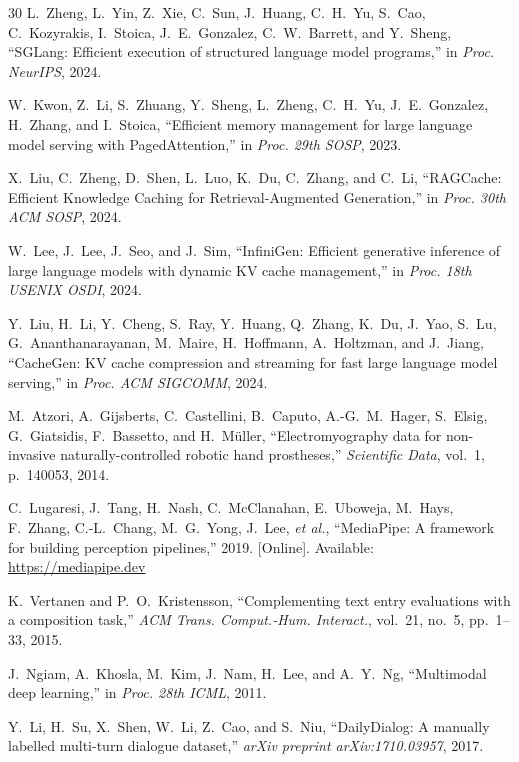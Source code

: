 \documentclass[journal]{IEEEtran}
\begin{document}
\begin{thebibliography}{30}
L.~Zheng, L.~Yin, Z.~Xie, C.~Sun, J.~Huang, C.~H.~Yu, S.~Cao, C.~Kozyrakis, I.~Stoica, J.~E.~Gonzalez, C.~W.~Barrett, and Y.~Sheng,
``{SGLang: Efficient execution of structured language model programs},''
in \emph{Proc. NeurIPS}, 2024.

W.~Kwon, Z.~Li, S.~Zhuang, Y.~Sheng, L.~Zheng, C.~H.~Yu, J.~E.~Gonzalez, H.~Zhang, and I.~Stoica,
``{Efficient memory management for large language model serving with PagedAttention},''
in \emph{Proc. 29th SOSP}, 2023.

X.~Liu, C.~Zheng, D.~Shen, L.~Luo, K.~Du, C.~Zhang, and C.~Li,
``{RAGCache: Efficient Knowledge Caching for Retrieval-Augmented Generation},''
in \emph{Proc. 30th ACM SOSP}, 2024.

W.~Lee, J.~Lee, J.~Seo, and J.~Sim,
``{InfiniGen: Efficient generative inference of large language models with dynamic KV cache management},''
in \emph{Proc. 18th USENIX OSDI}, 2024.

Y.~Liu, H.~Li, Y.~Cheng, S.~Ray, Y.~Huang, Q.~Zhang, K.~Du, J.~Yao, S.~Lu, G.~Ananthanarayanan, M.~Maire, H.~Hoffmann, A.~Holtzman, and J.~Jiang,
``{CacheGen: KV cache compression and streaming for fast large language model serving},''
in \emph{Proc. ACM SIGCOMM}, 2024.

M.~Atzori, A.~Gijsberts, C.~Castellini, B.~Caputo, A.-G.~M.~Hager, S.~Elsig, G.~Giatsidis, F.~Bassetto, and H.~M\"{u}ller,
``{Electromyography data for non-invasive naturally-controlled robotic hand prostheses},''
\emph{Scientific Data}, vol.~1, p.~140053, 2014.

C.~Lugaresi, J.~Tang, H.~Nash, C.~McClanahan, E.~Uboweja, M.~Hays, F.~Zhang, C.-L.~Chang, M.~G.~Yong, J.~Lee, \emph{et al.},
``{MediaPipe: A framework for building perception pipelines},''
2019. [Online]. Available: \url{https://mediapipe.dev}

K.~Vertanen and P.~O.~Kristensson,
``{Complementing text entry evaluations with a composition task},''
\emph{ACM Trans. Comput.-Hum. Interact.}, vol.~21, no.~5, pp.~1--33, 2015.

J.~Ngiam, A.~Khosla, M.~Kim, J.~Nam, H.~Lee, and A.~Y.~Ng,
``{Multimodal deep learning},''
in \emph{Proc. 28th ICML}, 2011.

Y.~Li, H.~Su, X.~Shen, W.~Li, Z.~Cao, and S.~Niu,
``{DailyDialog: A manually labelled multi-turn dialogue dataset},''
\emph{arXiv preprint arXiv:1710.03957}, 2017.


\end{thebibliography}
\end{document}
